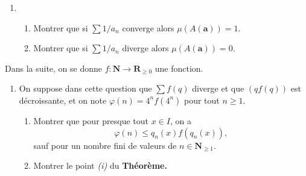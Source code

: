 \documentclass[a4paper,12pt]{article}
\theoremstyle{plain}
\theoremstyle{definition}
\newcommand{\R}{\mathbf{R}}
\newcommand{\N}{\mathbf{N}}
\begin{document}
\begin{enumerate}[label=\textbf{\arabic*.},resume]

\item 
\begin{enumerate}
\item Montrer que si $\sum 1 / a_n$ converge alors $\mu(A(\mathbf{a})) = 1$.
\item Montrer que si $\sum 1 / a_n$ diverge alors $\mu(A(\mathbf{a}))=0.$
\end{enumerate}
\end{enumerate}

Dans la suite, on se donne $f : \N \to \R_{\geq 0}$ une fonction.

\begin{enumerate}[label=\textbf{\arabic*.},resume]

\item On suppose dans cette question que $\sum f(q)$ diverge et que $(qf(q))$ est d\'ecroissante, et on note $\varphi(n) = 4^n f(4^n)$ pour tout $n \geq 1.$

\begin{enumerate}
\item Montrer que pour presque tout $x \in I$, on a 
$$
\varphi(n) \leq q_n(x) f(q_n(x)),
$$
sauf pour un nombre fini de valeurs de $n \in \N_{\geq 1}.$
\item Montrer le point \textit{(i)} du \textbf{Th\'eor\`eme.}
\end{enumerate}
\end{enumerate}
\end{document}
